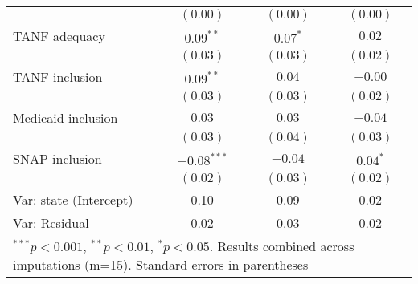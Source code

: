 \begin{table}
\begin{center}
\begin{tabular}{l c c c }
                           & $(0.00)$      & $(0.00)$      & $(0.00)$      \\
TANF adequacy              & $0.09^{**}$   & $0.07^{*}$    & $0.02$        \\
                           & $(0.03)$      & $(0.03)$      & $(0.02)$      \\
TANF inclusion             & $0.09^{**}$   & $0.04$        & $-0.00$       \\
                           & $(0.03)$      & $(0.03)$      & $(0.02)$      \\
Medicaid inclusion         & $0.03$        & $0.03$        & $-0.04$       \\
                           & $(0.03)$      & $(0.04)$      & $(0.03)$      \\
SNAP inclusion             & $-0.08^{***}$ & $-0.04$       & $0.04^{*}$    \\
                           & $(0.02)$      & $(0.03)$      & $(0.02)$      \\
\hline
Var: state (Intercept)     & 0.10          & 0.09          & 0.02          \\
Var: Residual              & 0.02          & 0.03          & 0.02          \\
\hline
\multicolumn{4}{l}{\scriptsize{$^{***}p<0.001$, $^{**}p<0.01$, $^*p<0.05$. Results combined across imputations (m=15). Standard errors in parentheses}}
\end{tabular}
\label{btab}
\end{center}
\end{table}
